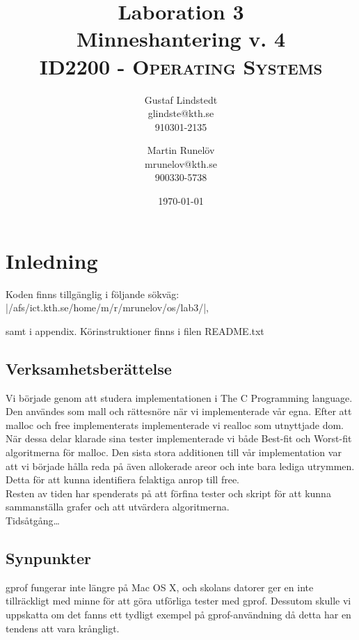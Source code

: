 \documentclass[paper=a4, fontsize=11pt]{scrartcl} %
\title{ 
\huge Laboration 3 \\ Minneshantering v. 4 \\ %
\vspace{10pt}
\normalfont \normalsize 
\textsc{ID2200 - Operating Systems } \\ [25pt] %
}
\author{Gustaf Lindstedt \\ glindste@kth.se \\ 910301-2135 \and Martin Runelöv \\ mrunelov@kth.se \\ 900330-5738}
\date{\vspace{8pt}\normalsize\today} %
\numberwithin{equation}{section} %
\numberwithin{figure}{section} %
\numberwithin{table}{section} %
\begin{document}
\maketitle

\section{Inledning}

Koden finns tillgänglig i följande sökväg: |/afs/ict.kth.se/home/m/r/mrunelov/os/lab3/|,

samt i appendix. Körinstruktioner finns i filen README.txt



\subsection{Verksamhetsberättelse}

Vi började genom att studera implementationen i The C Programming language.
Den användes som mall och rättesnöre när vi implementerade vår egna.
Efter att malloc och free implementerats implementerade vi realloc som
utnyttjade dom.
När dessa delar klarade sina tester implementerade vi både Best-fit och
Worst-fit algoritmerna för malloc.
Den sista stora additionen till vår implementation var att vi började hålla
reda på även allokerade areor och inte bara lediga utrymmen.
Detta för att kunna identifiera felaktiga anrop till free. \\

Resten av tiden har spenderats på att förfina tester och skript för att kunna
sammanställa grafer och att utvärdera algoritmerna.\\

Tidsåtgång\dots \\


\subsection{Synpunkter}
gprof fungerar inte längre på Mac OS X, och skolans datorer ger en inte
tillräckligt med minne för att göra utförliga tester med gprof.
Dessutom skulle vi uppskatta om det fanns ett tydligt exempel på
gprof-användning då detta har en tendens att vara krångligt.\\
\end{document}
